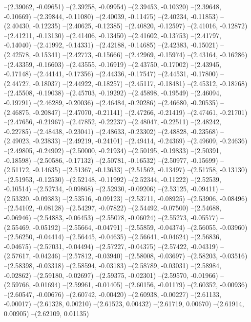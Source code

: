 --(2.39062, -0.09651)
--(2.39258, -0.09954)
--(2.39453, -0.10320)
--(2.39648, -0.10669)
--(2.39844, -0.11080)
--(2.40039, -0.11475)
--(2.40234, -0.11853)
--(2.40430, -0.12235)
--(2.40625, -0.12385)
--(2.40820, -0.12597)
--(2.41016, -0.12872)
--(2.41211, -0.13130)
--(2.41406, -0.13450)
--(2.41602, -0.13753)
--(2.41797, -0.14040)
--(2.41992, -0.14331)
--(2.42188, -0.14685)
--(2.42383, -0.15021)
--(2.42578, -0.15341)
--(2.42773, -0.15666)
--(2.42969, -0.15974)
--(2.43164, -0.16286)
--(2.43359, -0.16603)
--(2.43555, -0.16919)
--(2.43750, -0.17002)
--(2.43945, -0.17148)
--(2.44141, -0.17356)
--(2.44336, -0.17547)
--(2.44531, -0.17800)
--(2.44727, -0.18037)
--(2.44922, -0.18257)
--(2.45117, -0.18481)
--(2.45312, -0.18768)
--(2.45508, -0.19038)
--(2.45703, -0.19292)
--(2.45898, -0.19549)
--(2.46094, -0.19791)
--(2.46289, -0.20036)
--(2.46484, -0.20286)
--(2.46680, -0.20535)
--(2.46875, -0.20847)
--(2.47070, -0.21141)
--(2.47266, -0.21419)
--(2.47461, -0.21701)
--(2.47656, -0.21967)
--(2.47852, -0.22237)
--(2.48047, -0.22511)
--(2.48242, -0.22785)
--(2.48438, -0.23041)
--(2.48633, -0.23302)
--(2.48828, -0.23568)
--(2.49023, -0.23833)
--(2.49219, -0.24101)
--(2.49414, -0.24369)
--(2.49609, -0.24636)
--(2.49805, -0.24902)
--(2.50000, -0.21934)
--(2.50195, -0.19833)
--(2.50391, -0.18598)
--(2.50586, -0.17132)
--(2.50781, -0.16532)
--(2.50977, -0.15699)
--(2.51172, -0.14635)
--(2.51367, -0.13633)
--(2.51562, -0.13497)
--(2.51758, -0.13130)
--(2.51953, -0.12530)
--(2.52148, -0.11992)
--(2.52344, -0.11222)
--(2.52539, -0.10514)
--(2.52734, -0.09868)
--(2.52930, -0.09206)
--(2.53125, -0.09411)
--(2.53320, -0.09383)
--(2.53516, -0.09123)
--(2.53711, -0.08925)
--(2.53906, -0.08496)
--(2.54102, -0.08128)
--(2.54297, -0.07822)
--(2.54492, -0.07500)
--(2.54688, -0.06946)
--(2.54883, -0.06453)
--(2.55078, -0.06024)
--(2.55273, -0.05577)
--(2.55469, -0.05192)
--(2.55664, -0.04791)
--(2.55859, -0.04374)
--(2.56055, -0.03960)
--(2.56250, -0.04414)
--(2.56445, -0.04635)
--(2.56641, -0.04624)
--(2.56836, -0.04675)
--(2.57031, -0.04494)
--(2.57227, -0.04375)
--(2.57422, -0.04319)
--(2.57617, -0.04246)
--(2.57812, -0.03940)
--(2.58008, -0.03697)
--(2.58203, -0.03516)
--(2.58398, -0.03318)
--(2.58594, -0.03183)
--(2.58789, -0.03031)
--(2.58984, -0.02862)
--(2.59180, -0.02697)
--(2.59375, -0.02301)
--(2.59570, -0.01966)
--(2.59766, -0.01694)
--(2.59961, -0.01405)
--(2.60156, -0.01179)
--(2.60352, -0.00936)
--(2.60547, -0.00676)
--(2.60742, -0.00420)
--(2.60938, -0.00227)
--(2.61133, -0.00017)
--(2.61328, 0.00210)
--(2.61523, 0.00432)
--(2.61719, 0.00670)
--(2.61914, 0.00905)
--(2.62109, 0.01135)
